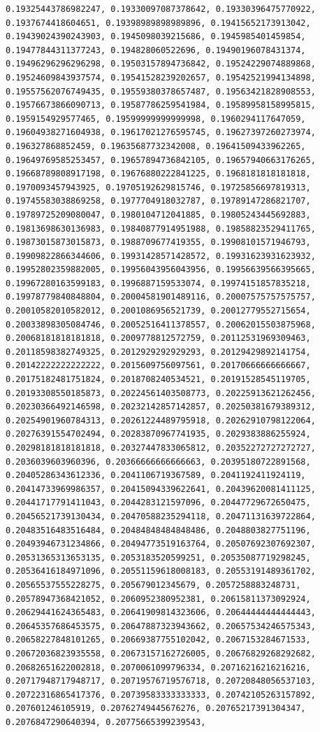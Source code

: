 \documentclass[11pt]{article}
\begin{document}
\begin{Verbatim}[commandchars=\\\{\}]
0.19325443786982247, 0.19330097087378642, 0.19330396475770922, 0.1937674418604651, 0.19398989898989896, 0.19415652173913042, 0.19439024390243903, 0.1945098039215686, 0.1945985401459854, 0.19477844311377243, 0.194828060522696, 0.19490196078431374, 0.19496296296296298, 0.19503157894736842, 0.19524229074889868, 0.19524609843937574, 0.19541528239202657, 0.19542521994134898, 0.19557562076749435, 0.19559380378657487, 0.19563421828908553, 0.19576673866090713, 0.19587786259541984, 0.19589958158995815, 0.1959154929577465, 0.19599999999999998, 0.1960294117647059, 0.19604938271604938, 0.19617021276595745, 0.19627397260273974, 0.196327868852459, 0.19635687732342008, 0.19641509433962265, 0.19649769585253457, 0.19657894736842105, 0.19657940663176265, 0.19668789808917198, 0.19676880222841225, 0.1968181818181818, 0.1970093457943925, 0.19705192629815746, 0.19725856697819313, 0.19745583038869258, 0.1977704918032787, 0.19789147286821707, 0.19789725209080047, 0.1980104712041885, 0.19805243445692883, 0.19813698630136983, 0.19840877914951988, 0.19858823529411765, 0.19873015873015873, 0.1988709677419355, 0.19908101571946793, 0.19909822866344606, 0.19931428571428572, 0.19931623931623932, 0.19952802359882005, 0.19956043956043956, 0.19956639566395665, 0.19967280163599183, 0.1996887159533074, 0.19974151857835218, 0.19978779840848804, 0.20004581901489116, 0.20007575757575757, 0.20010582010582012, 0.2001086956521739, 0.20012779552715654, 0.20033898305084746, 0.20052516411378557, 0.20062015503875968, 0.20068181818181818, 0.2009778812572759, 0.20112531969309463, 0.20118598382749325, 0.2012929292929293, 0.20129429892141754, 0.20142222222222222, 0.2015609756097561, 0.20170666666666667, 0.20175182481751824, 0.2018708240534521, 0.20191528545119705, 0.20193308550185873, 0.20224561403508773, 0.20225913621262456, 0.20230366492146598, 0.20232142857142857, 0.20250381679389312, 0.20254901960784313, 0.20261224489795918, 0.20262910798122064, 0.20276391554702494, 0.20283870967741935, 0.2029383886255924, 0.20298181818181818, 0.20327447833065812, 0.20352272727272727, 0.2036039603960396, 0.20366666666666663, 0.20395180722891568, 0.20405286343612336, 0.2041106719367589, 0.2041192411924119, 0.20414733969986357, 0.20415094339622641, 0.20439620081411125, 0.20441717791411043, 0.2044283121597096, 0.20447729672650475, 0.20456521739130434, 0.20470588235294118, 0.20471131639722864, 0.20483516483516484, 0.20484848484848486, 0.2048803827751196, 0.20493946731234866, 0.20494773519163764, 0.20507692307692307, 0.20531365313653135, 0.2053183520599251, 0.20535087719298245, 0.20536416184971096, 0.20551159618008183, 0.20553191489361702, 0.20565537555228275, 0.205679012345679, 0.2057258883248731, 0.20578947368421052, 0.2060952380952381, 0.20615811373092924, 0.20629441624365483, 0.20641909814323606, 0.20644444444444443, 0.20645357686453575, 0.20647887323943662, 0.20657534246575343, 0.20658227848101265, 0.20669387755102042, 0.2067153284671533, 0.20672036823935558, 0.20673157162726005, 0.20676829268292682, 0.20682651622002818, 0.2070061099796334, 0.20716216216216216, 0.20717948717948717, 0.20719576719576718, 0.20720848056537103, 0.20722316865417376, 0.20739583333333333, 0.20742105263157892, 0.207601246105919, 0.20762749445676276, 0.20765217391304347, 0.2076847290640394, 0.20775665399239543, 
\end{Verbatim}
\end{document}
